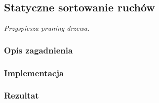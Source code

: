 \subsection{Statyczne sortowanie ruchów}
\label{subsec:sortowanie-ruchow}
\textit{Przyspiesza pruning drzewa.}


\subsubsection{Opis zagadnienia}
\subsubsection{Implementacja}
\subsubsection{Rezultat}